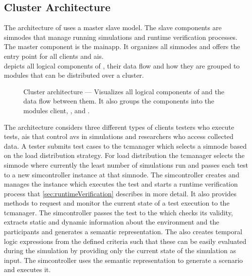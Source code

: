 \subsection{Cluster Architecture}
The architecture of \drivebuild{} uses a master slave model.
The slave components are \glspl{simnode} that manage running simulations and runtime verification processes.
The master component is the \gls{mainapp}.
It organizes all \glspl{simnode} and offers the entry point for all clients and \glspl{ai}.\\
 depicts all logical components of \drivebuild{}, their data flow and how they are grouped to modules that can be distributed over a cluster.
\begin{figure}
    \centering
    
    \medskip
    \caption{%
        Cluster architecture --- Visualizes all logical components of \drivebuild{} and the data flow between them.
        It also groups the components into the modules \colorbox{clusterClient}{client}, \colorbox{clusterMicroService}{}, \colorbox{clusterDbms}{} and \colorbox{clusterSimNode}{}.
    }\label{fig:systemArch}
\end{figure}
The architecture considers three different types of clients \ie{} testers who execute tests, \glspl{ai} that control \glspl{av} in simulations and researchers who access collected data.
A tester submits test cases to the \gls{tcmanager} which selects a \gls{simnode} based on the load distribution strategy.
For load distribution the \gls{tcmanager} selects the \gls{simnode} where currently the least number of simulations run and passes each test to a new \gls{simcontroller} instance at that \gls{simnode}.
The \gls{simcontroller} creates and manages the \beamng{} instance which executes the test and starts a runtime verification process that \cref{sec:runtimeVerification} describes in more detail.
It also provides methods to request and monitor the current state of a test execution to the \gls{tcmanager}.
The \gls{simcontroller} passes the test to the \transformer{} which checks its validity, extracts static and dynamic information about the environment and the participants and generates a semantic representation.
The \transformer{} also creates temporal logic expressions from the defined criteria such that these can be easily evaluated during the simulation by providing only the current state of the simulation as input.
The \gls{simcontroller} uses the semantic representation to generate a \beamng{} scenario and executes it.
